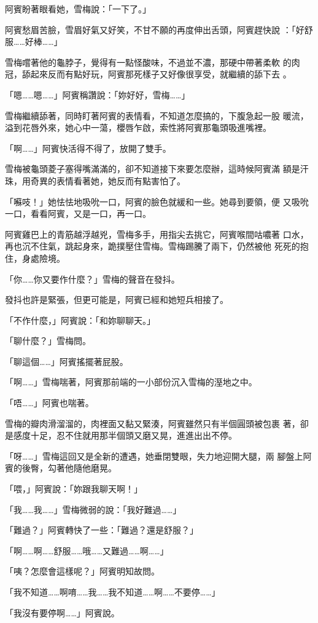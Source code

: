 阿賓盼著眼看她，雪梅說：「一下了。」

阿賓愁眉苦臉，雪眉好氣又好笑，不甘不願的再度伸出舌頭，阿賓趕快說
：「好舒服……好棒……」

雪梅嚐著他的龜脖子，覺得有一點怪酸味，不過並不濃，那硬中帶著柔軟
的肉冠，舔起來反而有點好玩，阿賓那死樣子又好像很享受，就繼續的舔下去
。

「嗯……嗯……」阿賓稱讚說：「妳好好，雪梅……」

雪梅繼續舔著，同時盯著阿賓的表情看，不知道怎麼搞的，下腹急起一股
暖流，溢到花唇外來，她心中一蕩，櫻唇乍啟，索性將阿賓那龜頭吸進嘴裡。

「啊……」阿賓快活得不得了，放開了雙手。

雪梅被龜頭菱子塞得嘴滿滿的，卻不知道接下來要怎麼辦，這時候阿賓滿
額是汗珠，用奇異的表情看著她，她反而有點害怕了。

「囌吱！」她怯怯地吸吮一口，阿賓的臉色就緩和一些。她尋到要領，便
又吸吮一口，看看阿賓，又是一口，再一口。

阿賓雞巴上的青筋越浮越兇，雪梅多手，用指尖去挑它，阿賓喉間咕噥著
口水，再也沉不住氣，跳起身來，跪撲壓住雪梅。雪梅踢騰了兩下，仍然被他
死死的抱住，身處險境。

「你……你又要作什麼？」雪梅的聲音在發抖。

發抖也許是緊張，但更可能是，阿賓已經和她短兵相接了。

「不作什麼，」阿賓說：「和妳聊聊天。」

「聊什麼？」雪梅問。

「聊這個……」阿賓搖擺著屁股。

「啊……」雪梅喘著，阿賓那前端的一小部份沉入雪梅的溼地之中。

「唔……」阿賓也喘著。

雪梅的瓣肉滑溜溜的，肉裡面又黏又緊湊，阿賓雖然只有半個圓頭被包裹
著，卻是感度十足，忍不住就用那半個頭又磨又晃，進進出出不停。

「呀……」雪梅這回又是全新的遭遇，她垂閉雙眼，失力地迎開大腿，兩
腳盤上阿賓的後臀，勾著他隨他磨晃。

「喂，」阿賓說：「妳跟我聊天啊！」

「我……我……」雪梅微弱的說：「我好難過……」

「難過？」阿賓轉快了一些：「難過？還是舒服？」

「啊……啊……舒服……哦……又難過……啊……」

「咦？怎麼會這樣呢？」阿賓明知故問。

「我不知道……啊唷……我……我不知道……啊……不要停……」

「我沒有要停啊……」阿賓說。

